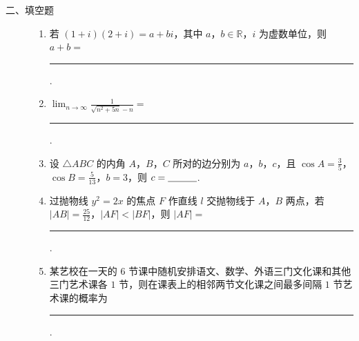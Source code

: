 \begin{description}

    \item[二、填空题]

    \begin{enumerate}[leftmargin=5pt]

      \addtocounter{enumi}{+10}

        \item 若 \( (1 + i)(2 + i) = a + bi \)，其中 \(a\)，\(b \in \mathbb{R}\)，\(i\) 为虚数单位，则 \( a + b = \)\rule[-0.3ex]{3em}{0.4pt}.

        \item \(\displaystyle\lim_{n\to\infty}\frac{1}{\sqrt{n^2 + 5n} - n}=\)\rule[-0.3ex]{3em}{0.4pt}.

        \item 设 \(\triangle ABC\) 的内角 \(A\)，\(B\)，\(C\) 所对的边分别为 \(a\)，\(b\)，\(c\)，且 \(\cos A = \frac{3}{5}\)，\(\cos B = \frac{5}{13}\)，\(b = 3\)，则 \(c =\rule[-0.3ex]{3em}{0.4pt}\).

        \item 过抛物线 \(y^{2}=2x\) 的焦点 \(F\) 作直线 \(l\) 交抛物线于 \(A\)，\(B\) 两点，若 \(|AB|=\frac{25}{12}\)，\(|AF|<|BF|\)，则 \(|AF|=\)\rule[-0.3ex]{3em}{0.4pt}.

        \item 某艺校在一天的 \(6\) 节课中随机安排语文、数学、外语三门文化课和其他三门艺术课各 \(1\) 节，则在课表上的相邻两节文化课之间最多间隔 \(1\) 节艺术课的概率为\rule[-0.3ex]{3em}{0.4pt}.

    \end{enumerate}

\end{description}


